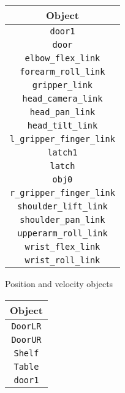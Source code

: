 \documentclass{nature}
\begin{document}
\begin{table}[htbp]

    \centering
    \fontsize{9}{10.5}\selectfont
    \begin{subfigure}[]{0.45\textwidth}
        \centering
        \begin{tabular}{c}
            \textbf{Object} \\
            \hline
            \texttt{door1} \\
            \texttt{door} \\
            \texttt{elbow\_flex\_link} \\
            \texttt{forearm\_roll\_link} \\
            \texttt{gripper\_link} \\
            \texttt{head\_camera\_link} \\
            \texttt{head\_pan\_link} \\
            \texttt{head\_tilt\_link} \\
            \texttt{l\_gripper\_finger\_link} \\
            \texttt{latch1} \\
            \texttt{latch} \\
            \texttt{obj0} \\
            \texttt{r\_gripper\_finger\_link} \\
            \texttt{shoulder\_lift\_link} \\
            \texttt{shoulder\_pan\_link} \\
            \texttt{upperarm\_roll\_link} \\
            \texttt{wrist\_flex\_link} \\
            \texttt{wrist\_roll\_link}
        \end{tabular}
        \caption{Position and velocity objects}
        \label{etab:robotics_pos}
    \end{subfigure}
    \quad \quad
    \begin{subfigure}[]{0.45\textwidth}
        \centering
        \begin{tabular}{c}
            \textbf{Object} \\
            \hline
                \texttt{DoorLR} \\
                \texttt{DoorUR} \\
                \texttt{Shelf} \\
                \texttt{Table} \\
                \texttt{door1} \\

\end{tabular}
\end{subfigure}
\end{table}
\end{document}
